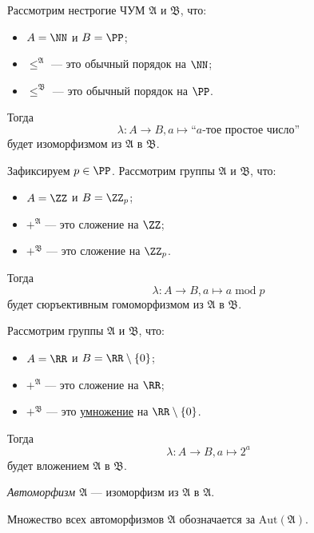 \documentclass[12pt,a4paper]{article}
\newcommand{\Aut}{\ensuremath{\mathrm{Aut}}\xspace}
\begin{document}
    \begin{example}
        Рассмотрим нестрогие ЧУМ $\mathfrak{A}$ и $\mathfrak{B}$, что:
        \begin{itemize}
            \item $A = \NN$ и $B = \PP$;
            \item ${\leqslant}^\mathfrak{A}$ --- это обычный порядок на $\NN$;
            \item ${\leqslant}^\mathfrak{B}$ --- это обычный порядок на $\PP$.
        \end{itemize}
        Тогда
        \[\lambda: A \to B, a \mapsto \text{``$a$-тое простое число''}\]
        будет изоморфизмом из $\mathfrak{A}$ в $\mathfrak{B}$.
    \end{example}

    \begin{example}
        Зафиксируем $p \in \PP$. Рассмотрим группы $\mathfrak{A}$ и $\mathfrak{B}$, что:
        \begin{itemize}
            \item $A = \ZZ$ и $B = \ZZ_p$;
            \item ${+}^\mathfrak{A}$ --- это сложение на $\ZZ$;
            \item ${+}^\mathfrak{B}$ --- это сложение на $\ZZ_p$.
        \end{itemize}
        Тогда
        \[\lambda: A \to B, a \mapsto a \mathop{\mathrm{mod}} p\]
        будет сюръективным гомоморфизмом из $\mathfrak{A}$ в $\mathfrak{B}$.
    \end{example}

    \begin{example}
        Рассмотрим группы $\mathfrak{A}$ и $\mathfrak{B}$, что:
        \begin{itemize}
            \item $A = \RR$ и $B = \RR \setminus \{0\}$;
            \item ${+}^\mathfrak{A}$ --- это сложение на $\RR$;
            \item ${+}^\mathfrak{B}$ --- это \underline{умножение} на $\RR \setminus \{0\}$.
        \end{itemize}
        Тогда
        \[\lambda: A \to B, a \mapsto 2^a\]
        будет вложением $\mathfrak{A}$ в $\mathfrak{B}$.
    \end{example}

    \begin{definition}
        \emph{Автоморфизм $\mathfrak{A}$} --- изоморфизм из $\mathfrak{A}$ в $\mathfrak{A}$.

        Множество всех автоморфизмов $\mathfrak{A}$ обозначается за $\Aut(\mathfrak{A})$.
    \end{definition}
\end{document}
